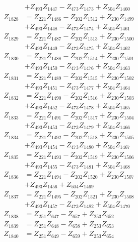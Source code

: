 \begin{multicols}{2}
\begin{align}
&+ Z_{493}Z_{1447} - Z_{473}Z_{1473} + Z_{504}Z_{1460} \nonumber \\
Z_{1828} &= Z_{221}Z_{1486} - Z_{202}Z_{1512} + Z_{230}Z_{1499}  \nonumber \\
&+ Z_{493}Z_{1448} - Z_{473}Z_{1474} + Z_{504}Z_{1461} \nonumber \\
Z_{1829} &= Z_{221}Z_{1487} - Z_{202}Z_{1513} + Z_{230}Z_{1500}  \nonumber \\
&+ Z_{493}Z_{1449} - Z_{473}Z_{1475} + Z_{504}Z_{1462} \nonumber \\
Z_{1830} &= Z_{221}Z_{1488} - Z_{202}Z_{1514} + Z_{230}Z_{1501}  \nonumber \\
&+ Z_{493}Z_{1450} - Z_{473}Z_{1476} + Z_{504}Z_{1463} \nonumber \\
Z_{1831} &= Z_{221}Z_{1489} - Z_{202}Z_{1515} + Z_{230}Z_{1502}  \nonumber \\
&+ Z_{493}Z_{1451} - Z_{473}Z_{1477} + Z_{504}Z_{1464} \nonumber \\
Z_{1832} &= Z_{221}Z_{1490} - Z_{202}Z_{1516} + Z_{230}Z_{1503}  \nonumber \\
&+ Z_{493}Z_{1452} - Z_{473}Z_{1478} + Z_{504}Z_{1465} \nonumber \\
Z_{1833} &= Z_{221}Z_{1491} - Z_{202}Z_{1517} + Z_{230}Z_{1504}  \nonumber \\
&+ Z_{493}Z_{1453} - Z_{473}Z_{1479} + Z_{504}Z_{1466} \nonumber \\
Z_{1834} &= Z_{221}Z_{1492} - Z_{202}Z_{1518} + Z_{230}Z_{1505}  \nonumber \\
&+ Z_{493}Z_{1454} - Z_{473}Z_{1480} + Z_{504}Z_{1467} \nonumber \\
Z_{1835} &= Z_{221}Z_{1493} - Z_{202}Z_{1519} + Z_{230}Z_{1506}  \nonumber \\
&+ Z_{493}Z_{1455} - Z_{473}Z_{1481} + Z_{504}Z_{1468} \nonumber \\
Z_{1836} &= Z_{221}Z_{1494} - Z_{202}Z_{1520} + Z_{230}Z_{1507}  \nonumber \\
&+ Z_{493}Z_{1456} + Z_{504}Z_{1469} \nonumber \\
Z_{1837} &= Z_{221}Z_{1495} - Z_{202}Z_{1521} + Z_{230}Z_{1508}  \nonumber \\
&+ Z_{493}Z_{1457} - Z_{473}Z_{1482} + Z_{504}Z_{1470} \nonumber \\
Z_{1838} &= Z_{251}Z_{647} - Z_{657} + Z_{253}Z_{652} \nonumber \\
Z_{1839} &= Z_{251}Z_{648} - Z_{658} + Z_{253}Z_{653} \nonumber \\
Z_{1840} &= Z_{251}Z_{649} - Z_{659} + Z_{253}Z_{654} \nonumber \\

\end{align}
\end{multicols}
